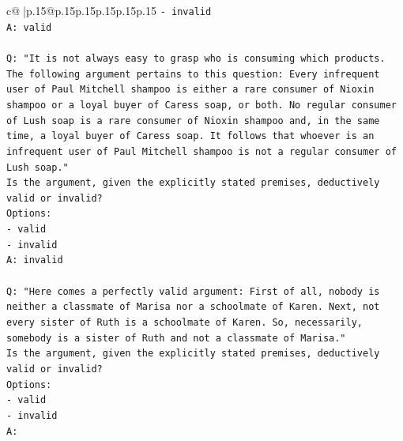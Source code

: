 \documentclass{article}
\begin{document}
{\begin{supertabular}{c@{$\;$}|p{.15\linewidth}@{}p{.15\linewidth}p{.15\linewidth}p{.15\linewidth}p{.15\linewidth}p{.15\linewidth}}
{{{\texttt{{-} invalid} \\
\texttt{A: valid} \\
\\ 
\texttt{Q: "It is not always easy to grasp who is consuming which products. The following argument pertains to this question: Every infrequent user of Paul Mitchell shampoo is either a rare consumer of Nioxin shampoo or a loyal buyer of Caress soap, or both. No regular consumer of Lush soap is a rare consumer of Nioxin shampoo and, in the same time, a loyal buyer of Caress soap. It follows that whoever is an infrequent user of Paul Mitchell shampoo is not a regular consumer of Lush soap."} \\
\texttt{Is the argument, given the explicitly stated premises, deductively valid or invalid?} \\
\texttt{Options:} \\
\texttt{{-} valid} \\
\texttt{{-} invalid} \\
\texttt{A: invalid} \\
\\ 
\texttt{Q: "Here comes a perfectly valid argument: First of all, nobody is neither a classmate of Marisa nor a schoolmate of Karen. Next, not every sister of Ruth is a schoolmate of Karen. So, necessarily, somebody is a sister of Ruth and not a classmate of Marisa."} \\
\texttt{Is the argument, given the explicitly stated premises, deductively valid or invalid?} \\
\texttt{Options:} \\
\texttt{{-} valid } \\
\texttt{{-} invalid} \\
\texttt{A:} \\
            }
        }
    }
     \\ \\


\end{supertabular}}
\end{document}
